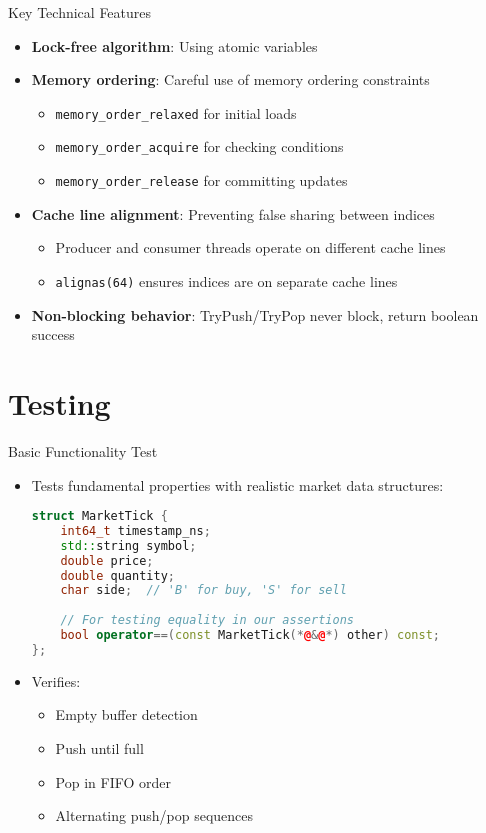 \documentclass{beamer}
\begin{document}
\begin{frame}{Key Technical Features}
\begin{itemize}
    \item \textbf{Lock-free algorithm}: Using atomic variables
    \item \textbf{Memory ordering}: Careful use of memory ordering constraints
    \begin{itemize}
        \item \texttt{memory\_order\_relaxed} for initial loads
        \item \texttt{memory\_order\_acquire} for checking conditions
        \item \texttt{memory\_order\_release} for committing updates
    \end{itemize}
    \item \textbf{Cache line alignment}: Preventing false sharing between indices
    \begin{itemize}
        \item Producer and consumer threads operate on different cache lines
        \item \texttt{alignas(64)} ensures indices are on separate cache lines
    \end{itemize}
    \item \textbf{Non-blocking behavior}: TryPush/TryPop never block, return boolean success
\end{itemize}
\end{frame}

\section{Testing}

\begin{frame}[fragile]{Basic Functionality Test}
\begin{itemize}
    \item Tests fundamental properties with realistic market data structures:
\begin{lstlisting}[language=C++]
struct MarketTick {
    int64_t timestamp_ns;
    std::string symbol;
    double price;
    double quantity;
    char side;  // 'B' for buy, 'S' for sell
    
    // For testing equality in our assertions
    bool operator==(const MarketTick(*@&@*) other) const;
};
\end{lstlisting}
    \item Verifies:
    \begin{itemize}
        \item Empty buffer detection
        \item Push until full
        \item Pop in FIFO order
        \item Alternating push/pop sequences
    \end{itemize}
\end{itemize}
\end{frame}
\end{document}
